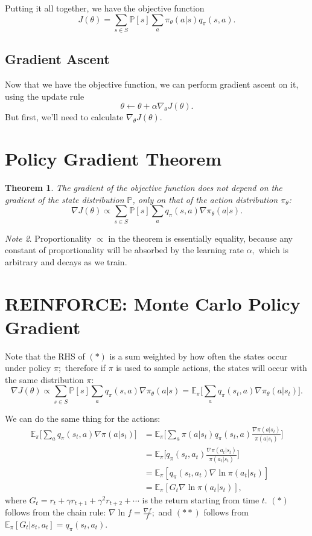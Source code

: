 \documentclass[20pt]{extarticle}
\theoremstyle{plain}
\newtheorem{theorem}{Theorem}
\theoremstyle{definition}
\theoremstyle{remark}
\newtheorem{note}[theorem]{Note}
\newcommand{\hE}{\mathbb E}
\newcommand{\hP}{\mathbb P}
\newcommand{\0}{\varnothing}
\newcommand{\<}{\langle}
\renewcommand{\>}{\rangle}
\begin{document}
Putting it all together, we have the objective function $$
J(\theta) = \sum_{s\in S} \hP[s] \sum_{a} \pi_\theta(a|s) q_\pi(s, a).
$$

\subsection{Gradient Ascent}

Now that we have the objective function, we can perform gradient ascent on it, using the update rule $$
  \theta \gets \theta + \alpha \nabla_\theta J(\theta).
$$
But first, we'll need to calculate $ \nabla_\theta J(\theta). $

\section{Policy Gradient Theorem}

\begin{theorem}
The gradient of the objective function does not depend on the gradient of the state distribution $ \hP $, only on that of the action distribution $ \pi_\theta $:
\[
\nabla J(\theta) \propto \sum_{s\in S} \hP[s] \sum_{a} q_\pi(s, a) \nabla \pi_\theta(a|s). \tag{$ * $}
\]
\end{theorem}

\begin{note}
  Proportionality $ \propto $ in the theorem is essentially equality, because any constant of proportionality will be absorbed by the learning rate $ \alpha, $ which is arbitrary and decays as we train.
\end{note}

\section{REINFORCE: Monte Carlo Policy Gradient}

Note that the RHS of $ (*) $ is a sum weighted by how often the states occur under policy $ \pi; $ therefore if $ \pi $ is used to sample actions, the states will occur with the same distribution $ \pi $:
$$
\nabla J(\theta) \propto \sum_{s\in S} \hP[s] \sum_{a} q_\pi(s, a) \nabla \pi_\theta(a|s) = \hE_\pi \big[ \sum_{a} q_\pi(s_t, a) \nabla \pi_\theta(a|s_t) \big].
$$

We can do the same thing for the actions: \begin{align*}
\hE_\pi \big[ \sum_{a} q_\pi(s_t, a) \nabla \pi(a|s_t) \big] &= \hE_\pi \Big[ \sum_{a} \pi(a|s_t) q_\pi(s_t, a) \frac{\nabla \pi(a|s_t)}{\pi(a|s_t)} \Big] \\
&= \hE_\pi \Big[ q_\pi(s_t, a_t) \frac{\nabla \pi(a_t|s_t)}{\pi(a_t|s_t)} \Big] \\
&= \hE_\pi [ q_\pi(s_t, a_t) \nabla \ln \pi(a_t|s_t) ] \tag{$ * $}\\
&= \hE_\pi [ G_t \nabla \ln \pi(a_t|s_t) ] \tag{$ ** $},
\end{align*}
where $ G_t = r_t + \gamma r_{t+1} + \gamma^2 r_{t+2} + \cdots $ is the return starting from time $ t. $ $ (*) $ follows from the chain rule: $ \nabla \ln f = \frac{\nabla f}{f}; $ and $ (**) $ follows from $ \hE_\pi [ G_t | s_t, a_t ] = q_\pi(s_t, a_t). $
\end{document}
